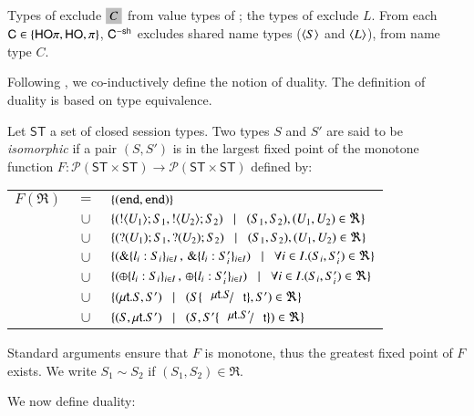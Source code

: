Types of \HO exclude $\nonhosyntax{C}$ from 
value types of \HOp; the types of \sessp exclude $L$. 
From each $\mathsf{C} \in \{\mathsf{HO}\pi, \mathsf{HO}, \pi \}$, $\mathsf{C}^{-\mathsf{sh}}$ 
excludes shared name types ($\langle S \rangle$ and $\langle L \rangle$), 
from name type $C$.

Following \cite{TGC14}, we co-inductively define the notion of duality.
The definition of duality is based on type equivalence.

\begin{definition}
\label{def:iso}
Let $\mathsf{ST}$ a set of closed session types. 
Two types $S$ and $S'$ are said to be {\em isomorphic} if a pair $(S,S')$ is 
in the largest fixed point of the monotone function
$F:\mathcal{P}(\mathsf{ST}\times \mathsf{ST}) \to 
\mathcal{P}(\mathsf{ST}\times \mathsf{ST})$ defined by:

\hspace{-0.5cm}\begin{tabular}{rcl}
$F(\Re)$ &$\!\!=\!\!$&	$\{(\mathtt{end}, \mathtt{end})\}$\\
         &$\!\!\cup\!\!$&	$\{(! \langle U_1 \rangle ; S_1, ! \langle U_2 \rangle ; S_2)
\;\;\;|\;\;\; (S_1, S_2),(U_1, U_2)\in \Re\}$\\ 
       &$\!\!\cup\!\!$&	$\{(? (U_1) ; S_1, ? (U_2) ; S_2)
\;\;\;|\;\;\;(S_1, S_2),(U_1, U_2)\in \Re\}$\\ 
	&$\!\!\cup\!\!$&	$\{(\& \{l_i: S_i\}_{i \in I} \,,\, \& \{l_i: S_i'\}_{i \in I}) \;\;\;|\;\;\; \forall i\in I. (S_i, S_i')\in \Re\}$\\
	&$\!\!\cup\!\!$&	$\{(\oplus \{l_i: S_i\}_{i \in I}\,,\, \oplus \{l_i: S_i'\}_{i \in I}) \;\;\;|\;\;\; \forall i\in I. (S_i, S_i')\in \Re\}$\\
	&$\!\!\cup\!\!$&	$\set{(\trec{t}{S}, S')
\bnfbar (S\subst{\trec{t}{S}}{\vart{t}},S')\in \Re}$\\
	&$\!\!\cup\!\!$&	$\set{(S,\trec{t}{S'})
\bnfbar (S,S'\subst{\trec{t}{S'}}{\vart{t}})\in \Re}$
\end{tabular}
	
\noindent
Standard arguments ensure that $F$ is monotone, thus the greatest fixed point
of $F$ exists. We write $S_1 \sim S_2$ if  $(S_1,S_2)\in \Re$. 
\end{definition}

\smallskip 

We now define duality:

